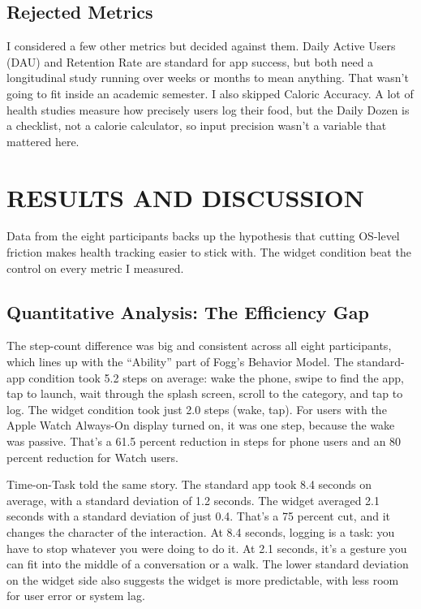 \documentclass[10pt,twocolumn]{article}
\begin{document}
\subsection{Rejected Metrics}

I considered a few other metrics but decided against them. Daily Active Users (DAU) and Retention Rate are standard for app success, but both need a longitudinal study running over weeks or months to mean anything.\cite{MatthewsGlanceability} That wasn't going to fit inside an academic semester. I also skipped Caloric Accuracy. A lot of health studies measure how precisely users log their food, but the Daily Dozen is a checklist, not a calorie calculator, so input precision wasn't a variable that mattered here.

\section{RESULTS AND DISCUSSION}

Data from the eight participants backs up the hypothesis that cutting OS-level friction makes health tracking easier to stick with. The widget condition beat the control on every metric I measured.

\subsection{Quantitative Analysis: The Efficiency Gap}

The step-count difference was big and consistent across all eight participants, which lines up with the ``Ability'' part of Fogg's Behavior Model.\cite{FoggBehaviorModel} The standard-app condition took 5.2 steps on average: wake the phone, swipe to find the app, tap to launch, wait through the splash screen, scroll to the category, and tap to log. The widget condition took just 2.0 steps (wake, tap). For users with the Apple Watch Always-On display turned on, it was one step, because the wake was passive. That's a 61.5 percent reduction in steps for phone users and an 80 percent reduction for Watch users.

Time-on-Task told the same story. The standard app took 8.4 seconds on average, with a standard deviation of 1.2 seconds. The widget averaged 2.1 seconds with a standard deviation of just 0.4. That's a 75 percent cut, and it changes the character of the interaction. At 8.4 seconds, logging is a task: you have to stop whatever you were doing to do it. At 2.1 seconds, it's a gesture you can fit into the middle of a conversation or a walk. The lower standard deviation on the widget side also suggests the widget is more predictable, with less room for user error or system lag.
\end{document}
